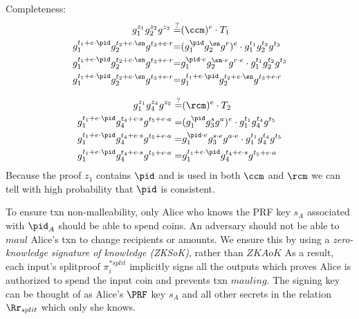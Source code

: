 Completeness: 
\begin{equation}
    \begin{aligned}
        g_1^{z_1}g_2^{z_2}g^{z_3} \stackrel{?}{=}& (\ccm)^e \cdot T_1\\
        g_1^{t_1 + e \cdot \pid}g_2^{t_2 + e \cdot \sn}g^{t_3 + e \cdot r} {=}& (g_1^{\pid}g_2^{\sn}g^r)^e \cdot g_1^{t_1}g_2^{t_2}g^{t_3}\\
        g_1^{t_1 + e \cdot \pid}g_2^{t_2 + e \cdot \sn}g^{t_3 + e \cdot r} {=}& g_1^{\pid \cdot e}g_2^{\sn \cdot e}g^{r\cdot e} \cdot g_1^{t_1}g_2^{t_2}g^{t_3}\\
        g_1^{t_1 + e \cdot \pid}g_2^{t_2 + e \cdot \sn}g^{t_3 + e \cdot r} {=}& g_1^{t_1 + e \cdot \pid}g_2^{t_2 + e \cdot \sn}g^{t_3 + e \cdot r}\\
    \end{aligned}
\end{equation}

\begin{equation}
    \begin{aligned}
        g_1^{z_1}g_4^{z_4}g^{z_5} \stackrel{?}{=}& (\rcm)^e \cdot T_2 \\
        g_1^{t_1 + e \cdot \pid}g_4^{t_4 + e \cdot s}g^{t_5 + e \cdot a} =& (g_1^{\pid}g_3^sg^a)^e \cdot g_1^{t_1}g_4^{t_4}g^{t_5}\\
        g_1^{t_1 + e \cdot \pid}g_4^{t_4 + e \cdot s}g^{t_5 + e \cdot a} =& g_1^{\pid \cdot e}g_3^{s \cdot e}g^{a \cdot e} \cdot g_1^{t_1}g_4^{t_4}g^{t_5}\\
        g_1^{t_1 + e \cdot \pid}g_4^{t_4 + e \cdot s}g^{t_5 + e \cdot a} =& g_1^{t_1 + e \cdot \pid}g_4^{t_4 + e \cdot s}g^{t_5 + e \cdot a}\\
    \end{aligned}
\end{equation}
Because the proof $z_1$ contains $\pid$ and is used in both $\ccm$ and $\rcm$ we can tell with high probability that $\pid$ is consistent.

To ensure txn non-malleability, only Alice who knows the PRF key $s_A$ associated with $\pid_A$ should be able to spend coins. An adversary should not be able to $maul$ Alice's txn to change recipients or amounts. We ensure this by using a \textit{zero-knowledge signature of knowledge (ZKSoK)}, rather than $ZKAoK$ As a result, each input's splitproof $\pi^{*split}_i$ implicitly signs all the outputs which proves Alice is authorized to spend the input coin and prevents txn $mauling$. The signing key can be thought of as Alice's $\PRF$ key $s_A$ and all other secrets in the relation $\Rr_{split}$ which only she knows.

